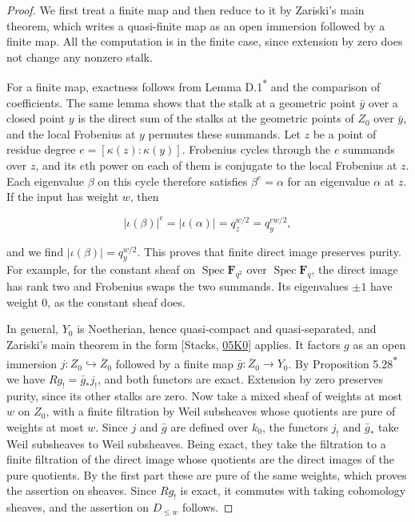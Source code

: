\documentclass[11pt]{article}
\newcommand{\bpout}[1]{#1\textsuperscript{\hyperlink{bp-outside}{\ensuremath{\ast}}}}
\begin{document}
\begin{proof}[{Proof}]\label{bp276}%
We first treat a finite map and then reduce to it by Zariski's main theorem, which writes a quasi-finite map as an open immersion followed by a finite map. All the computation is in the finite case, since extension by zero does not change any nonzero stalk.

For a finite map, exactness follows from Lemma \bpout{D.1} and the comparison of coefficients. The same lemma shows that the stalk at a geometric point \(\bar y\) over a closed point \(y\) is the direct sum of the stalks at the geometric points of \(Z_0\) over \(\bar y\), and the local Frobenius at \(y\) permutes these summands. Let \(z\) be a point of residue degree \(e=[\kappa(z):\kappa(y)]\). Frobenius cycles through the \(e\) summands over \(z\), and its \(e\)th power on each of them is conjugate to the local Frobenius at \(z\). Each eigenvalue \(\beta\) on this cycle therefore satisfies \(\beta^e=\alpha\) for an eigenvalue \(\alpha\) at \(z\). If the input has weight \(w\), then

\[
|\iota(\beta)|^e=|\iota(\alpha)|=q_z^{w/2}=q_y^{ew/2},
\]

and we find \(|\iota(\beta)|=q_y^{w/2}\). This proves that finite direct image preserves purity. For example, for the constant sheaf on \(\operatorname{Spec}\mathbf F_{q^2}\) over \(\operatorname{Spec}\mathbf F_q\), the direct image has rank two and Frobenius swaps the two summands. Its eigenvalues \(\pm1\) have weight \(0\), as the constant sheaf does.

In general, \(Y_0\) is Noetherian, hence quasi-compact and quasi-separated, and Zariski's main theorem in the form [Stacks, \href{https://stacks.math.columbia.edu/tag/05K0}{05K0}] applies. It factors \(g\) as an open immersion \(j:Z_0\hookrightarrow\overline Z_0\) followed by a finite map \(\bar g:\overline Z_0\to Y_0\). By Proposition \bpout{5.28} we have \(Rg_!=\bar g_*j_!\), and both functors are exact. Extension by zero preserves purity, since its other stalks are zero. Now take a mixed sheaf of weights at most \(w\) on \(Z_0\), with a finite filtration by Weil subsheaves whose quotients are pure of weights at most \(w\). Since \(j\) and \(\bar g\) are defined over \(k_0\), the functors \(j_!\) and \(\bar g_*\) take Weil subsheaves to Weil subsheaves. Being exact, they take the filtration to a finite filtration of the direct image whose quotients are the direct images of the pure quotients. By the first part these are pure of the same weights, which proves the assertion on sheaves. Since \(Rg_!\) is exact, it commutes with taking cohomology sheaves, and the assertion on \(D_{\leq w}\) follows.
\end{proof}
\end{document}

